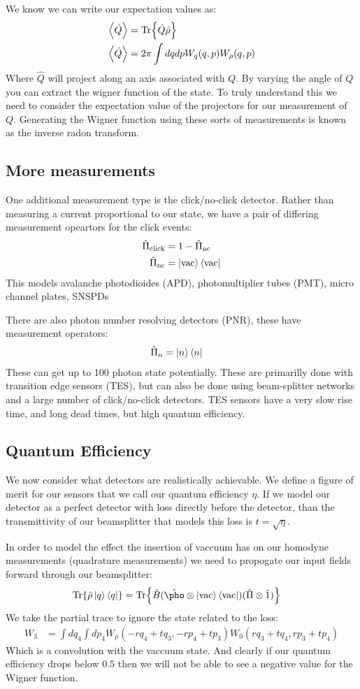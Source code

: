 We know we can write our expectation values as:
\begin{align*}
	\expval{\hat{Q}} &= \Tr{\hat{Q}\hat{\rho}} \\
	\expval{\hat{Q}} &= 2\pi \int dqdp W_q(q,p)W_\rho(q,p)
\end{align*}
Where $\hat{Q}$ will project along an axis associated with $Q$. By varying the angle of $Q$ you can extract the wigner function of the state. To truly understand this we need to consider the expectation value of the projectors for our measurement of $Q$.
Generating the Wigner function using these sorts of measurements is known as the inverse radon transform.
\subsection{More measurements}
One additional measurement type is the click/no-click detector. Rather than measuring a current proportional to our state, we have a pair of differing measurement opeartors for the click events:
\begin{align*}
	\hat{\Pi}_\text{click} &= 1 - \hat{\Pi}_\text{nc} \\
	\hat{\Pi}_\text{nc} &= \ket{\text{vac}}\bra{\text{vac}}
\end{align*}
This models avalanche photodioides (APD), photomultiplier tubes (PMT), micro channel plates, SNSPDs

There are also photon number resolving detectors (PNR), these have measurement operators:
\begin{align*}
	\hat{\Pi}_n &= \ket{n}\bra{n}
\end{align*}
These can get up to 100 photon state potentially. These are primarilly done with transition edge sensors (TES), but can also be done using beam-splitter networks and a large number of click/no-click detectors.
TES sensors have a very slow rise time, and long dead times, but high quantum efficiency.

\subsection{Quantum Efficiency}
We now consider what detectors are realistically achievable. We define a figure of merit for our sensors that we call our quantum efficiency $\eta$.
If we model our detector as a perfect detector with loss directly before the detector, than the transmittivity of our beamsplitter that models this loss is $t=\sqrt{\eta}$.

In order to model the effect the insertion of vaccuum has on our homodyne measurements (quadrature measurements) we need to propogate our input fields forward through our beamsplitter:
\begin{align*}
	\Tr{\hat{\rho}\ket{q}\bra{q}} &= \Tr{\hat{B}(\hat{\pho}\otimes\vac\vacb)(\hat{\Pi}\otimes\hat{1})}
\end{align*}
We take the partial trace to ignore the state related to the loss:
\begin{align*}
	W_3 &= \int dq_4\int dp_4 W_\rho(-r q_4 + t q_3, -rp_4 + tp_3) W_0(rq_3 + tq_4, rp_3 + tp_4)
\end{align*}
Which is a convolution with the vaccuum state. And clearly if our quantum efficiency drops below $0.5$ then we will not be able to see a negative value for the Wigner function.
